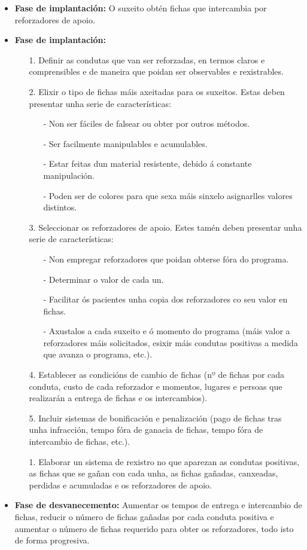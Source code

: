 \documentclass[a4paper,11pt]{article}
\begin{document}
\begin{itemize}
	\item \textbf{Fase de implantación:} O suxeito obtén fichas que intercambia por reforzadores de 
	apoio.
	\item \textbf{Fase de implantación:}
	\begin{itemize}
		\item[1.] Definir as condutas que van ser reforzadas, en termos claros e comprensibles e de 
		maneira que poidan ser observables e rexistrables.
		\item[2.] Elixir o tipo de fichas máis axeitadas para os suxeitos. Estas deben presentar unha 
		serie de características:
		\begin{itemize}
			\item[-] Non ser fáciles de falsear ou obter por outros métodos.
			\item[-] Ser facilmente manipulables e acumulables.
			\item[-] Estar feitas dun material resistente, debido á constante manipulación.
			\item[-] Poden ser de colores para que sexa máis sinxelo asignarlles valores distintos.
		\end{itemize}
		\item[3.] Seleccionar os reforzadores de apoio. Estes tamén deben presentar unha serie de 
		características:
		\begin{itemize}
			\item[-] Non empregar reforzadores que poidan obterse fóra do programa.
			\item[-] Determinar o valor de cada un.
			\item[-] Facilitar ós pacientes unha copia dos reforzadores co seu valor en fichas.
			\item[-] Axustalos a cada suxeito e ó momento do programa (máis valor a reforzadores máis 
			solicitados, esixir máis condutas positivas a medida que avanza o programa, etc.).
		\end{itemize}
		\item[4.] Establecer as condicións de cambio de fichas (nº de fichas por cada conduta, custo 
		de cada reforzador e momentos, lugares e persoas que realizarán a entrega de fichas e os 
		intercambios).
		\item[5.] Incluir sistemas de bonificación e penalización (pago de fichas tras unha 
		infracción, tempo fóra de ganacia de fichas, tempo fóra de intercambio de fichas, etc.). 
		\item[1.] Elaborar un sistema de rexistro no que aparezan as condutas positivas, as fichas 
		que se gañan con cada unha, as fichas gañadas, canxeadas, perdidas e acumuladas e os 
		reforzadores de apoio. 
	\end{itemize}
	\item \textbf{Fase de desvanecemento:} Aumentar os tempos de entrega e intercambio de fichas, 
	reducir o número de fichas gañadas por cada conduta positiva e aumentar o número de fichas 
	requerido para obter os reforzadores, todo isto de forma progresiva. 
\end{itemize}
\end{document}
